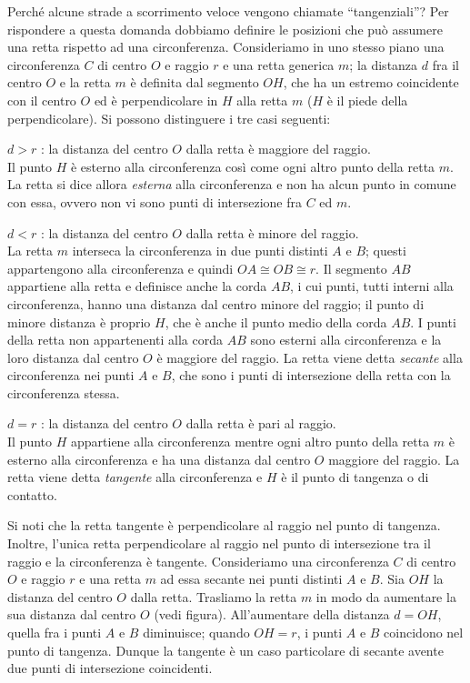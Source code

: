 Perché alcune strade a scorrimento veloce vengono chiamate ``tangenziali''?
Per rispondere a questa domanda dobbiamo definire le posizioni che può assumere una retta rispetto ad una circonferenza.
Consideriamo in uno stesso piano una circonferenza $C$ di centro $O$ e raggio $r$ e una retta generica $m$; la distanza $d$ fra il centro $O$ e la retta $m$ è definita dal segmento $OH$, che ha un estremo coincidente con il centro $O$ ed è perpendicolare in $H$ alla retta $m$ ($H$ è il piede della perpendicolare). Si possono distinguere i tre casi seguenti:

\begin{enumeratea}

\item $d > r$ : la distanza del centro $O$ dalla retta è maggiore del raggio.\\
Il punto $H$ è esterno alla circonferenza così come ogni altro punto della retta $m$. La retta si dice allora \emph{esterna} alla circonferenza e non ha alcun punto in comune con essa, ovvero non vi sono punti di intersezione fra $C$ ed $m$.

\item $d < r$ : la distanza del centro $O$ dalla retta è minore del raggio.\\
La retta $m$ interseca la circonferenza in due punti distinti $A$ e $B$; questi appartengono alla circonferenza e quindi $OA\cong OB\cong r$. Il segmento $AB$ appartiene alla retta e definisce anche la corda $AB$, i cui punti, tutti interni alla circonferenza, hanno una distanza dal centro minore del raggio; il punto di minore distanza è proprio $H$, che è anche il punto medio della corda $AB$. I punti della retta non appartenenti alla corda $AB$ sono esterni alla circonferenza e la loro distanza dal centro $O$ è maggiore del raggio.
La retta viene detta \emph{secante} alla circonferenza nei punti $A$ e $B$, che sono i punti di intersezione della retta con la circonferenza stessa.

\item $d = r$ : la distanza del centro $O$ dalla retta è pari al raggio.\\
Il punto $H$ appartiene alla circonferenza mentre ogni altro punto della retta $m$ è esterno alla circonferenza e ha una distanza dal centro $O$ maggiore del raggio. La retta viene detta \emph{tangente} alla circonferenza e $H$ è il punto di tangenza o di contatto.

\end{enumeratea}

Si noti che la retta tangente è perpendicolare al raggio nel punto di tangenza. Inoltre, l'unica retta perpendicolare al raggio nel punto di intersezione tra il raggio e la circonferenza è tangente.
Consideriamo una circonferenza $C$ di centro $O$ e raggio $r$ e una retta $m$ ad essa secante nei punti distinti $A$ e $B$. Sia $OH$ la distanza del centro $O$ dalla retta. 
Trasliamo la retta $m$ in modo da aumentare la sua distanza dal centro $O$ (vedi figura). All'aumentare della distanza $d = OH$, quella fra i punti $A$ e $B$ diminuisce; quando $OH = r$, i punti $A$ e $B$ coincidono nel punto di tangenza. Dunque la tangente è un caso particolare di secante avente due punti di intersezione coincidenti.

